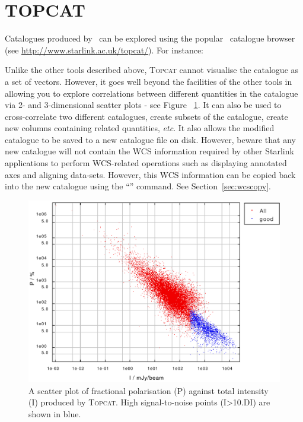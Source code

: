 \section{TOPCAT}

Catalogues produced by \poltwomap\ can be explored using the popular
\topcat\ catalogue browser (see \url{http://www.starlink.ac.uk/topcat/}). For
instance:

\begin{terminalv}
\end{terminalv}

Unlike the other tools described above, \textsc{Topcat} cannot visualise the
catalogue as a set of vectors. However, it goes well beyond the
facilities of the other tools in allowing you to explore correlations
between different quantities in the catalogue via 2- and 3-dimensional
scatter plots - see Figure~ \ref{fig:topcat}. It can also be used to
cross-correlate two different
catalogues, create subsets of the catalogue, create new columns
containing related quantities, \emph{etc}. It also allows the modified
catalogue to be saved to a new catalogue file on disk. However, beware
that any new catalogue will not contain the WCS information required
by other Starlink applications to perform WCS-related operations such as
displaying annotated axes and aligning data-sets. However, this WCS
information can be copied back into the new catalogue using the
``'' command. See Section~\ref{sec:wcscopy}.

\begin{figure}[t!]
\begin{center}
\includegraphics[width=0.75\linewidth]{sc22-topcat}
\caption [A TOPCAT scatter plot]{A scatter plot of fractional polarisation (P)
against total intensity (I) produced by \textsc{Topcat}. High signal-to-noise points
(I>10.DI) are shown in blue.\label{fig:topcat}}
\end{center}
\end{figure}

